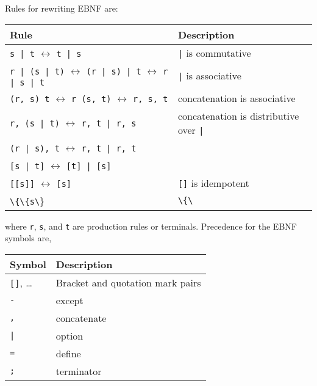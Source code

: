 \documentclass[fsharpnotes.tex]{subfiles}
\begin{document}
Rules for rewriting EBNF are:
\begin{center}
  \begin{tabularx}{\linewidth}{|l|X|}
    \hline
    \rowcolor{headerRowColor} Rule & Description\\
    \hline
    \lstinline[language=ebnf]{s | t} $\leftrightarrow$ \lstinline[language=ebnf]{t | s} & \lstinline[language=ebnf]{|} is commutative \\
    \hline
    \lstinline[language=ebnf]{r | (s | t)} $\leftrightarrow$ \lstinline[language=ebnf]{(r | s) | t} $\leftrightarrow$ \lstinline[language=ebnf]{r | s | t} & \lstinline[language=ebnf]{|} is associative \\
    \hline
    \lstinline[language=ebnf]{(r, s) t} $\leftrightarrow$ \lstinline[language=ebnf]{r (s, t)} $\leftrightarrow$ \lstinline[language=ebnf]{r, s, t} & concatenation is associative \\
    \hline
    \lstinline[language=ebnf]{r, (s | t)} $\leftrightarrow$ \lstinline[language=ebnf]{r, t | r, s} & concatenation is distributive over \lstinline[language=ebnf]{|}\\
    \lstinline[language=ebnf]{(r | s), t} $\leftrightarrow$ \lstinline[language=ebnf]{r, t | r, t} &\\
    \hline
    \lstinline[language=ebnf]{[s | t]} $\leftrightarrow$ \lstinline[language=ebnf]{[t] | [s]} &\\
    \hline
    \lstinline[language=ebnf]{[[s]]} $\leftrightarrow$ \lstinline[language=ebnf]{[s]} & \lstinline[language=ebnf]{[]} is idempotent \\
    \hline
    \lstinline[language=ebnf]{\{\{s\}\}} $\leftrightarrow$ \lstinline[language=ebnf]{\{s\}} & \lstinline[language=ebnf]{\{\}} is idempotent \\
    \hline
  \end{tabularx}
\end{center}
where \lstinline[language=ebnf]{r}, \lstinline[language=ebnf]{s}, and \lstinline[language=ebnf]{t} are production rules or terminals. Precedence for the EBNF symbols are,
\begin{center}
  \begin{tabular}{|l|l|}
    \hline
    \rowcolor{headerRowColor} Symbol & Description\\
    \hline
    \lstinline[language=ebnf]![]!, \ldots & Bracket and quotation mark pairs\\
    \hline
    \lstinline[language=ebnf]!-! & except\\
    \hline
    \lstinline[language=ebnf]!,! & concatenate\\
    \hline
    \lstinline[language=ebnf]!|! & option\\
    \hline
    \lstinline[language=ebnf]!=! & define\\
    \hline
    \lstinline[language=ebnf]!;! & terminator\\
    \hline
  \end{tabular}
\end{center}
\end{document}
